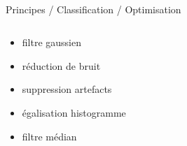\begin{frame}{\bititle\\Principes / Classification / Optimisation}
\begin{columns}\begin{column}{.5\textwidth}

\begin{itemize}
\item<1-> filtre gaussien
\item<2-> réduction de bruit
\item<3-> suppression artefacts
\item<4-> égalisation histogramme
\item<5-> filtre médian
\end{itemize}

\end{column}\begin{column}{.5\textwidth}


\end{column}\end{columns}
\end{frame}
